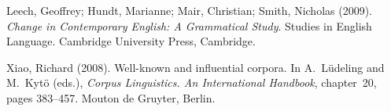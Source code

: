 \documentclass[a4paper,12pt]{article}
\begin{document}
\begin{thebibliography}{99}

Leech, Geoffrey; Hundt, Marianne; Mair, Christian; Smith, Nicholas (2009).
{\em Change in Contemporary English: A Grammatical Study}.
Studies in English Language. Cambridge University Press, Cambridge.

Xiao, Richard (2008).
Well-known and influential corpora.
In A.~L{\"u}deling and M.~Kyt{\"o} (eds.), {\em Corpus Linguistics. An International Handbook}, chapter~20, pages 383--457. Mouton de Gruyter, Berlin.

\end{thebibliography}
\end{document}
